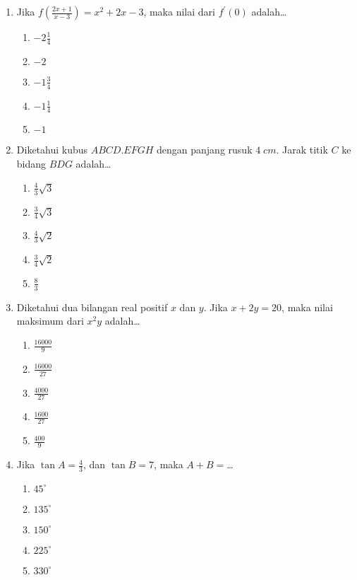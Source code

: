 \documentclass[A4,12PT, english, twocolumn]{journal}
\begin{document}
\begin{enumerate}
\item Jika $f\left( \frac{2x+1}{x-3} \right) = x^2 + 2x - 3$, maka nilai dari $f^\prime (0)$ adalah\dots
	\begin{enumerate}
       \item $-2\frac{1}{4}$ 
       \item $-2$   
       \item $-1\frac{3}{4}$ 
       \item $-1\frac{1}{4}$   
       \item $-1$
	\end{enumerate}

\item Diketahui kubus $ABCD.EFGH$ dengan panjang rusuk $4 \; cm$. Jarak titik $C$ ke bidang $BDG$ adalah\dots
	\begin{enumerate}
       \item $\frac{4}{3}\sqrt{3}$ 
       \item $\frac{3}{4}\sqrt{3}$  
       \item $\frac{4}{3}\sqrt{2}$ 
       \item $\frac{3}{4}\sqrt{2}$   
       \item $\frac{8}{3}$
	\end{enumerate}

\item Diketahui dua bilangan real positif $x$ dan $y$. Jika $x + 2y = 20$, maka nilai maksimum dari $x^2y$ adalah\dots
	\begin{enumerate}
       \item $\frac{16000}{9}$ 
       \item $\frac{16000}{27}$  
       \item $\frac{4000}{27}$ 
       \item $\frac{1600}{27}$   
       \item $\frac{400}{9}$
	\end{enumerate}

\item Jika $\tan{A} = \frac{4}{3}$, dan $\tan {B} = 7$, maka $A + B =$\dots
	\begin{enumerate}
       \item $45^\circ$ 
       \item $135^\circ$   
       \item $150^\circ$ 
       \item $225^\circ$  
       \item $330^\circ$
	\end{enumerate}


\end{enumerate}
\end{document}
